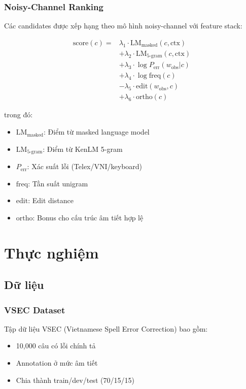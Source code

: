 \documentclass[conference]{IEEEtran}
\begin{document}
\subsubsection{Noisy-Channel Ranking}
Các candidates được xếp hạng theo mô hình noisy-channel với feature stack:

\begin{equation}
\begin{split}
\text{score}(c) = & \lambda_1 \cdot \text{LM}_{\text{masked}}(c, \text{ctx}) \\
                  & + \lambda_2 \cdot \text{LM}_{5\text{-gram}}(c, \text{ctx}) \\
                  & + \lambda_3 \cdot \log P_{\text{err}}(w_{\text{obs}} | c) \\
                  & + \lambda_4 \cdot \log \text{freq}(c) \\
                  & - \lambda_5 \cdot \text{edit}(w_{\text{obs}}, c) \\
                  & + \lambda_6 \cdot \text{ortho}(c)
\end{split}
\end{equation}

trong đó:
\begin{itemize}
    \item $\text{LM}_{\text{masked}}$: Điểm từ masked language model
    \item $\text{LM}_{5\text{-gram}}$: Điểm từ KenLM 5-gram
    \item $P_{\text{err}}$: Xác suất lỗi (Telex/VNI/keyboard)
    \item $\text{freq}$: Tần suất unigram
    \item $\text{edit}$: Edit distance
    \item $\text{ortho}$: Bonus cho cấu trúc âm tiết hợp lệ
\end{itemize}

\section{Thực nghiệm}

\subsection{Dữ liệu}

\subsubsection{VSEC Dataset}
Tập dữ liệu VSEC (Vietnamese Spell Error Correction) \cite{vsec2023} bao gồm:
\begin{itemize}
    \item 10,000 câu có lỗi chính tả
    \item Annotation ở mức âm tiết
    \item Chia thành train/dev/test (70/15/15)
\end{itemize}
\end{document}
